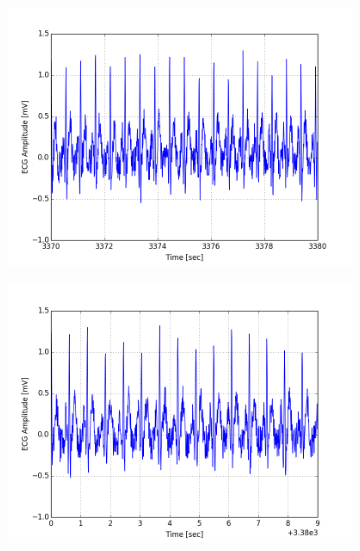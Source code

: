 \documentclass[paper=a4, fontsize=11pt]{scrartcl}
\numberwithin{equation}{section}		%
\numberwithin{figure}{section}			%
\numberwithin{table}{section}		    %
\begin{document}
\begin{appendices}
\begin{figure}[H]
	\centering
	\begin{subfigure}[b]{0.3\textwidth}
		\includegraphics[width=\textwidth]{sim/ecg_73}
	\end{subfigure}
	\begin{subfigure}[b]{0.3\textwidth}
		\includegraphics[width=\textwidth]{sim/ecg_74}
	\end{subfigure}
	\begin{subfigure}[b]{0.3\textwidth}

\end{subfigure}
\end{figure}
\end{appendices}
\end{document}
